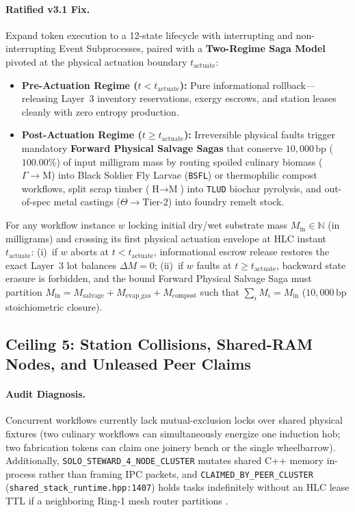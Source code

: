 \paragraph{Ratified v3.1 Fix.}
Expand token execution to a 12-state lifecycle with interrupting and non-interrupting Event Subprocesses, paired with a \textbf{Two-Regime Saga Model} pivoted at the physical actuation boundary $t_{\text{actuate}}$:
\begin{itemize}
  \item \textbf{Pre-Actuation Regime ($t < t_{\text{actuate}}$):} Pure informational rollback---releasing Layer~3 inventory reservations, exergy escrows, and station leases cleanly with zero entropy production.
  \item \textbf{Post-Actuation Regime ($t \ge t_{\text{actuate}}$):} Irreversible physical faults trigger mandatory \textbf{Forward Physical Salvage Sagas} that conserve $10{,}000\,\text{bp}$ ($100.00\%$) of input milligram mass by routing spoiled culinary biomass ($\Gamma \to \text{M}$) into Black Soldier Fly Larvae (\texttt{BSFL}) or thermophilic compost workflows, split scrap timber ($\text{H} \to \text{M}$) into \texttt{TLUD} biochar pyrolysis, and out-of-spec metal castings ($\Theta \to \text{Tier-2}$) into foundry remelt stock.
\end{itemize}

\begin{invariant}
\label{inv:two-regime-saga}
For any workflow instance $w$ locking initial dry/wet substrate mass $M_{\text{in}} \in \mathbb{N}$ (in milligrams) and crossing its first physical actuation envelope at HLC instant $t_{\text{actuate}}$: (i)~if $w$ aborts at $t < t_{\text{actuate}}$, informational escrow release restores the exact Layer~3 lot balances $\Delta M = 0$; (ii)~if $w$ faults at $t \ge t_{\text{actuate}}$, backward state erasure is forbidden, and the bound Forward Physical Salvage Saga must partition $M_{\text{in}} = M_{\text{salvage}} + M_{\text{evap\_gas}} + M_{\text{compost}}$ such that $\sum_i M_i = M_{\text{in}}$ ($10{,}000\,\text{bp}$ stoichiometric closure).
\end{invariant}

\subsection{Ceiling 5: Station Collisions, Shared-RAM Nodes, and Unleased Peer Claims}

\paragraph{Audit Diagnosis.}
Concurrent workflows currently lack mutual-exclusion locks over shared physical fixtures (two culinary workflows can simultaneously energize one induction hob; two fabrication tokens can claim one joinery bench or the single wheelbarrow). Additionally, \texttt{SOLO\_STEWARD\_4\_NODE\_CLUSTER} mutates shared C++ memory in-process rather than framing IPC packets, and \texttt{CLAIMED\_BY\_PEER\_CLUSTER} (\texttt{shared\_stack\_runtime.hpp:1407}) holds tasks indefinitely without an HLC lease TTL if a neighboring Ring-1 mesh router partitions \parencite{fall2003}.

